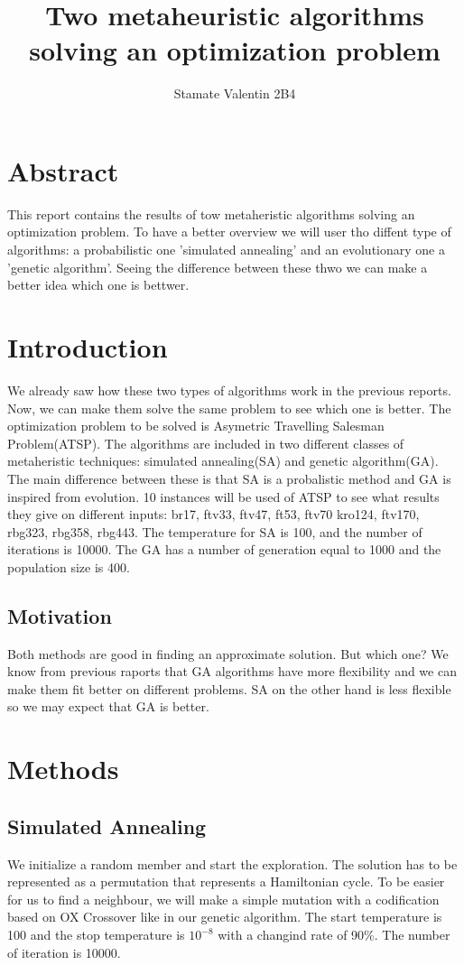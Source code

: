 \documentclass[12pt,leqno]{article}
\title{Two metaheuristic algorithms solving an optimization problem}
\author{Stamate Valentin 2B4}
\begin{document}
\maketitle

\section*{Abstract}
  This report contains the results of tow metaheristic algorithms solving an optimization
  problem. To have a better overview we will user tho diffent type of algorithms: a probabilistic
  one 'simulated annealing' and an evolutionary one a 'genetic algorithm'. Seeing the
  difference between these thwo we can make a better idea which one is bettwer. 

\section{Introduction}
  We already saw how these two types of algorithms work in the previous reports. Now, we
  can make them solve the same problem to see which one is better. The optimization problem
  to be solved is Asymetric Travelling Salesman Problem(ATSP). The algorithms are included
  in two different classes of metaheristic techniques: simulated annealing(SA) and genetic algorithm(GA).
  The main difference between these is that SA is a probalistic method and GA is inspired from evolution.
  10 instances will be used of ATSP to see what results they give on different inputs: br17, ftv33, ftv47, ft53, ftv70
  kro124, ftv170, rbg323, rbg358, rbg443. The temperature for SA is 100, and the number of iterations is 10000.
  The GA has a number of generation equal to 1000 and the population size is 400.
  
\subsection{Motivation}
  Both methods are good in finding an approximate solution. But which one? We know from previous
  raports that GA algorithms have more flexibility and we can make them fit better
  on different problems. SA on the other hand is less flexible so we may expect that
  GA is better.

\section{Methods}
  \subsection{Simulated Annealing}
    We initialize a random member and start the exploration. The solution has to be represented as a permutation
    that represents a Hamiltonian cycle. To be easier for us to find a neighbour, we will make a simple mutation with a codification based on OX Crossover
    like in our genetic algorithm. The start temperature is 100 and the stop temperature is $10^{-8}$ with a changind rate of 90\%. The number of iteration is 10000.
    
\end{document}
